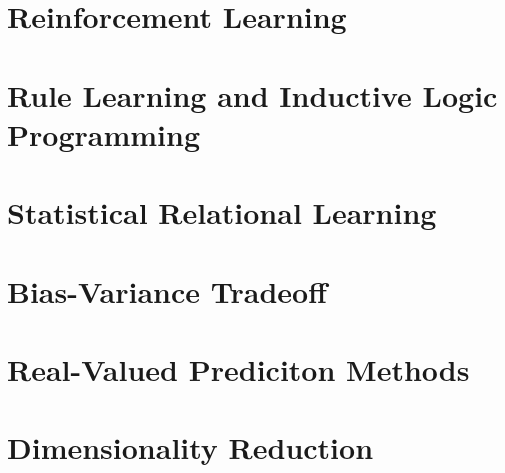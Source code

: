 \documentclass{article}
\begin{document}
	\section{Reinforcement Learning}
		\clearpage
	
	\section{Rule Learning and Inductive Logic Programming}
		\clearpage	

	\section{Statistical Relational Learning}
		\clearpage

	\section{Bias-Variance Tradeoff}
		\clearpage

	\section{Real-Valued Prediciton Methods}
		\clearpage

	\section{Dimensionality Reduction}
		\clearpage

	\appendix


	
\end{document}
